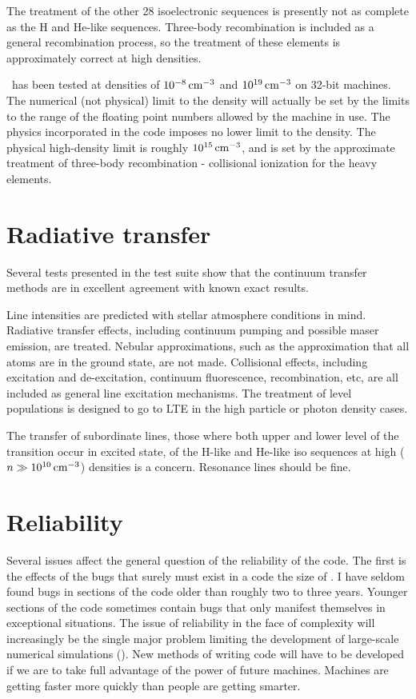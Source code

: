 The treatment of the other 28 isoelectronic sequences is presently not
as complete as the H and He-like sequences.
Three-body recombination is
included as a general recombination process, so the treatment of these
elements is approximately correct at high densities.

\Cloudy\ has been tested at densities of $10^{-8} {\rm\thinspace cm^{-3}}$
and $10^{19} {\rm\thinspace cm^{-3}}$ on 32-bit machines.
The numerical (not physical) limit to the density will actually
be set by the limits to the range of the floating point numbers allowed
by the machine in use.
The physics incorporated in the code imposes no
lower limit to the density.
The physical high-density limit is roughly
$10^{15} {\rm\thinspace cm^{-3}}$, and is set by the approximate treatment
of three-body recombination - collisional ionization for the
heavy elements.

\section{Radiative transfer}

Several tests presented in the test suite show that the continuum transfer
methods are in excellent agreement with known exact results.

Line intensities are predicted with stellar atmosphere conditions in
mind.
Radiative transfer effects, including continuum pumping and possible
maser emission, are treated.
Nebular approximations, such as the
approximation that all atoms are in the ground state, are not made.
Collisional effects, including excitation and de-excitation, continuum
fluorescence, recombination, etc, are all included as general line
excitation mechanisms.
The treatment of level populations is designed to go to LTE
in the high particle or photon density cases.

The transfer of subordinate lines, those where both upper and lower
level of the transition occur in excited state, of the H-like and
He-like iso sequences at high ($n \gg 10^{10} {\rm\thinspace cm^{-3}}$) densities
is a concern.
Resonance lines should be fine.

\section{Reliability}

Several issues affect the general question of the reliability of the
code.
The first is the effects of the bugs that surely must exist in a
code the size of \Cloudy.
I have seldom found bugs in sections of the code
older than roughly two to three years.
Younger sections of the code
sometimes contain bugs that only manifest themselves in exceptional
situations.
The issue of reliability in the face of complexity will
increasingly be the single major problem limiting the development of
large-scale numerical simulations (\citealp{Ferland2001b}).
New methods of writing
code will have to be developed if we are to take full advantage of the power
of future machines.
Machines are getting faster more quickly than people
are getting smarter.


